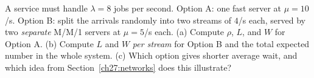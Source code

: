 \begin{exercise}
\label{ch27:exr-pooling}
A service must handle $\lambda = 8$ jobs per second. Option A: one fast server at $\mu = 10$/s.
Option B: split the arrivals randomly into two streams of $4$/s each, served by two \emph{separate}
M/M/1 servers at $\mu = 5$/s each. (a) Compute $\rho$, $L$, and $W$ for Option A. (b) Compute $L$ and
$W$ \emph{per stream} for Option B and the total expected number in the whole system. (c) Which
option gives shorter average wait, and which idea from Section~\ref{ch27:networks} does this
illustrate?
\end{exercise}
